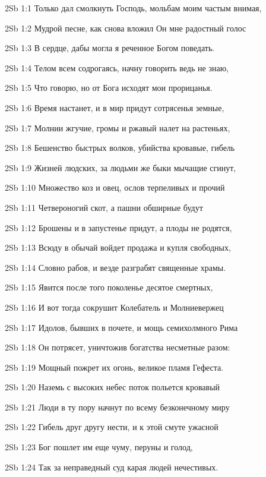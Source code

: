 \vs 2Sb 1:1 Только дал смолкнуть Господь, мольбам моим частым внимая,

\vs 2Sb 1:2 Мудрой песне, как снова вложил Он мне радостный голос 

\vs 2Sb 1:3 В сердце, дабы могла я реченное Богом поведать. 

\vs 2Sb 1:4 Телом всем содрогаясь, начну говорить  ведь не знаю, 

\vs 2Sb 1:5 Что говорю, но от Бога исходят мои прорицанья.

\vs 2Sb 1:6 Время настанет, и в мир придут сотрясенья земные, 

\vs 2Sb 1:7 Молнии жгучие, громы и ржавый налет на растеньях, 

\vs 2Sb 1:8 Бешенство быстрых волков, убийства кровавые, гибель 

\vs 2Sb 1:9 Жизней людских, за людьми же быки мычащие сгинут, 

\vs 2Sb 1:10 Множество коз и овец, ослов терпеливых и прочий 

\vs 2Sb 1:11 Четвероногий скот, а пашни обширные будут 

\vs 2Sb 1:12 Брошены и в запустенье придут, а плоды не родятся, 

\vs 2Sb 1:13 Всюду в обычай войдет продажа и купля свободных, 

\vs 2Sb 1:14 Словно рабов, и везде разграбят священные храмы.

\vs 2Sb 1:15 Явится после того поколенье десятое смертных, 

\vs 2Sb 1:16 И вот тогда сокрушит Колебатель и Молниевержец 

\vs 2Sb 1:17 Идолов, бывших в почете, и мощь семихолмного Рима 

\vs 2Sb 1:18 Он потрясет, уничтожив богатства несметные разом: 

\vs 2Sb 1:19 Мощный пожрет их огонь, великое пламя Гефеста.

\vs 2Sb 1:20 Наземь с высоких небес поток польется кровавый

\vs 2Sb 1:21 Люди в ту пору начнут по всему безконечному миру 

\vs 2Sb 1:22 Гибель друг другу нести, и к этой смуте ужасной 

\vs 2Sb 1:23 Бог пошлет им еще чуму, перуны и голод, 

\vs 2Sb 1:24 Так за неправедный суд карая людей нечестивых. 

